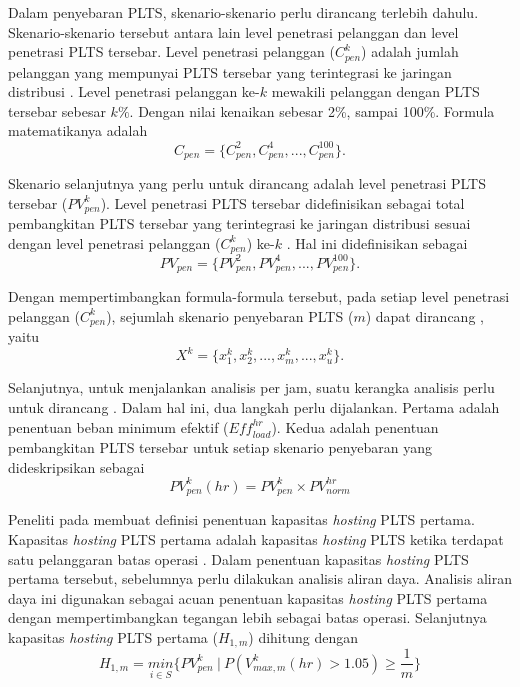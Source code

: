 {{{{{{Dalam penyebaran PLTS, skenario-skenario perlu dirancang terlebih dahulu. Skenario-skenario tersebut antara lain level penetrasi pelanggan dan level penetrasi PLTS tersebar. Level penetrasi pelanggan ($C_{pen}^k$) adalah jumlah pelanggan yang mempunyai PLTS tersebar yang terintegrasi ke jaringan distribusi \cite{Dubey2017}. Level penetrasi pelanggan ke-$k$ mewakili pelanggan dengan PLTS tersebar sebesar $k\%$. Dengan nilai kenaikan sebesar 2\%, sampai 100\%. Formula matematikanya adalah
\begin{equation}
C_{pen}=\{C^2_{pen},C^4_{pen},...,C^{100}_{pen}\}\label{cpl}.
\end{equation}

Skenario selanjutnya yang perlu untuk dirancang adalah level penetrasi PLTS tersebar ($PV^k_{pen}$). Level penetrasi PLTS tersebar didefinisikan sebagai total pembangkitan PLTS tersebar yang terintegrasi ke jaringan distribusi sesuai dengan level penetrasi pelanggan ($C_{pen}^k$) ke-$k$ \cite{Dubey2017}. Hal ini didefinisikan sebagai
\begin{equation}
PV_{pen}=\{PV^2_{pen},PV^4_{pen},...,PV^{100}_{pen}\}\label{rppl}.
\end{equation}

Dengan mempertimbangkan formula-formula tersebut, pada setiap level penetrasi pelanggan  ($C_{pen}^k$), sejumlah skenario penyebaran PLTS ($m$) dapat dirancang \cite{Dubey2017}, yaitu
\begin{equation}
X^k=\{x^k_{1},x^k_{2},...,x^{k}_{m},...,x^{k}_{u}\}\label{rpds]}.
\end{equation}

Selanjutnya, untuk menjalankan analisis per jam, suatu kerangka analisis perlu untuk dirancang \cite{Dubey2017}. Dalam hal ini, dua langkah perlu dijalankan. Pertama adalah penentuan beban minimum efektif ($\mathit{Eff^{hr}_{load}}$). Kedua adalah penentuan pembangkitan PLTS tersebar untuk setiap skenario penyebaran yang dideskripsikan sebagai
\begin{equation}
PV^k_{pen}(hr)=PV^k_{pen}\times PV^{hr}_{norm}\label{hrpia}
\end{equation}

Peneliti pada \cite{Dubey2017} membuat definisi penentuan kapasitas \textit{hosting} PLTS pertama. Kapasitas \textit{hosting} PLTS pertama adalah kapasitas \textit{hosting} PLTS ketika terdapat satu pelanggaran batas operasi \cite{Dubey2017}. Dalam penentuan kapasitas \textit{hosting} PLTS pertama tersebut, sebelumnya perlu dilakukan analisis aliran daya. Analisis aliran daya ini digunakan sebagai acuan penentuan kapasitas \textit{hosting} PLTS pertama dengan mempertimbangkan tegangan lebih sebagai batas operasi. Selanjutnya kapasitas \textit{hosting} PLTS pertama ($\mathit{H_{1,m}}$) dihitung dengan \cite{Dubey2017}
\begin{equation}
\mathit{H_{1,m}}=\underset{i\in S}{min}\Big\{PV^k_{pen}\ |\ P(V^k_{max,m}(hr)>1.05)\geq \dfrac{1}{m}\Big\}\label{fphc}
\end{equation}


}}}}}}
